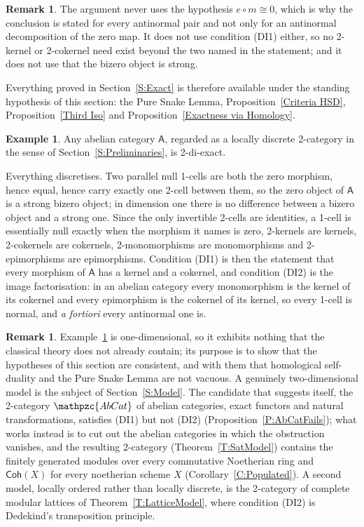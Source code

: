 \documentclass[reqno,a4paper]{amsart}
\numberwithin{equation}{section}
\theoremstyle{plain}
\theoremstyle{definition}
\newtheorem{example}[subsection]{Example}
\newtheorem{remark}[subsection]{Remark}
\def\nameit#1{\textrm{#1}~}
\def\thex{\nameit{Theorem}}
\def\prox{\nameit{Proposition}}
\def\corx{\nameit{Corollary}}
\def\exax{\nameit{Example}}
\newcommand{\comp}{\circ}
\newcommand{\iso}{\cong}
\newcommand{\catfont}[1]{\ensuremath{\mathpzc{#1}}\xspace}
\newcommand{\onecat}[1]{\ensuremath{\mathsf{#1}}\xspace}
\newcommand{\AbCat}{\catfont{AbCat}}
\renewcommand{\1}{\onecat{1}}
\newcommand{\Coh}{\onecat{Coh}}
\begin{document}
\begin{remark}\label{Rem Bridge Cost}
	The argument never uses the hypothesis \(e\comp m\iso 0\), which is why the conclusion is stated for every antinormal pair and not only for an antinormal decomposition of the zero map. It does not use condition \textup{(DI1)} either, so no 2-kernel or 2-cokernel need exist beyond the two named in the statement; and it does not use that the bizero object is strong.
\end{remark}

Everything proved in Section~\ref{S:Exact} is therefore available under the standing hypothesis of this section: the Pure Snake Lemma, \prox\ref{Criteria HSD}, \prox\ref{Third Iso} and \prox\ref{Exactness via Homology}.

\begin{example}\label{Ex DiExact}
	Any abelian category \(\onecat{A}\), regarded as a locally discrete 2-category in the sense of Section~\ref{S:Preliminaries}, is 2-di-exact.

	Everything discretises. Two parallel null 1-cells are both the zero morphism, hence equal, hence carry exactly one 2-cell between them, so the zero object of \(\onecat{A}\) is a strong bizero object; in dimension one there is no difference between a bizero object and a strong one. Since the only invertible 2-cells are identities, a 1-cell is essentially null exactly when the morphism it names is zero, 2-kernels are kernels, 2-cokernels are cokernels, 2-monomorphisms are monomorphisms and 2-epimorphisms are epimorphisms. Condition \textup{(DI1)} is then the statement that every morphism of \(\onecat{A}\) has a kernel and a cokernel, and condition \textup{(DI2)} is the image factorisation: in an abelian category every monomorphism is the kernel of its cokernel and every epimorphism is the cokernel of its kernel, so every 1-cell is normal, and \emph{a fortiori} every antinormal one is.
\end{example}

\begin{remark}\label{Rem Model}
	\exax\ref{Ex DiExact} is one-dimensional, so it exhibits nothing that the classical theory does not already contain; its purpose is to show that the hypotheses of this section are consistent, and with them that homological self-duality and the Pure Snake Lemma are not vacuous. A genuinely two-dimensional model is the subject of Section~\ref{S:Model}. The candidate that suggests itself, the 2-category \(\AbCat\) of abelian categories, exact functors and natural transformations, satisfies \textup{(DI1)} but not \textup{(DI2)} (\prox\ref{P:AbCatFails}); what works instead is to cut out the abelian categories in which the obstruction vanishes, and the resulting 2-category (\thex\ref{T:SatModel}) contains the finitely generated modules over every commutative Noetherian ring and \(\Coh(X)\) for every noetherian scheme \(X\) (\corx\ref{C:Populated}). A second model, locally ordered rather than locally discrete, is the 2-category of complete modular lattices of \thex\ref{T:LatticeModel}, where condition \textup{(DI2)} is Dedekind's transposition principle.
\end{remark}
\end{document}

